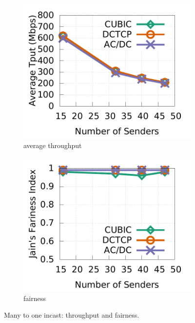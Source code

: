 \fi
\begin{figure}[t]
        \centering
        \begin{subfigure}[b]{0.225\textwidth}
                \centering
                \includegraphics[width=\textwidth]{figures/incast/plots9k/incast_tput_vary_sender.pdf}
                \caption{average throughput}
                \label{incast_9k_tput}
        \end{subfigure}
        \begin{subfigure}[b]{0.225\textwidth}
                \centering
                \includegraphics[width=\textwidth]{figures/incast/plots9k/incast_fairness_vary_sender.pdf}
                \caption{fairness}
                \label{incast_9k_fariness}
        \end{subfigure}
        \caption{Many to one incast: throughput and fairness.}
        \label{incast_9k_tput_fairness}
\end{figure}

